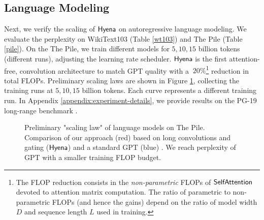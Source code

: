 \subsection{Language Modeling}\label{res:lm}
%
Next, we verify the scaling of ${\sf Hyena}$ on autoregressive language modeling. We evaluate the perplexity on {\sc WikiText103} (Table \ref{wt103}) and {\sc The Pile} (Table \ref{pile}). On the {\sc The Pile}, we train different models for $5, 10, 15$ billion tokens (different runs), adjusting the learning rate scheduler. ${\sf Hyena}$ is the first attention-free, convolution architecture to match GPT quality with a $~20\%$\footnote{The FLOP reduction consists in the \textit{non-parametric} FLOPs of {$\sf SelfAttention$} devoted to attention matrix computation. The ratio of parametric to non-parametric FLOPs (and hence the gains) depend on the ratio of model width $D$ and sequence length $L$ used in training.} reduction in total FLOPs. Preliminary scaling laws are shown in Figure \ref{fig:hyena_laws}, collecting the training runs at $5, 10, 15$ billion tokens. Each curve represents a different training run.
In Appendix \ref{appendix:experiment-details}, we provide results on the PG-19 long-range benchmark \citep{raecompressive2019}.
%


\begin{figure}[t]
    \centering
    
    \vspace{-4mm}
    \caption{Preliminary "scaling law" of language models on {\sc The Pile}. Comparison of our approach (red) based on long convolutions and gating (${\sf Hyena}$) and a standard GPT (blue) \citep{brown2020language}. We reach perplexity of GPT with a smaller training FLOP budget.}
    \label{fig:hyena_laws}
\end{figure}


